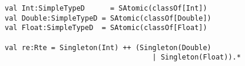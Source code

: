 \begin{lstlisting}[style=scalaioScala]
val Int:SimpleTypeD      = SAtomic(classOf[Int])
val Double:SimpleTypeD = SAtomic(classOf[Double])
val Float:SimpleTypeD  = SAtomic(classOf[Float])

val re:Rte = Singleton(Int) ++ (Singleton(Double) 
                                   | Singleton(Float)).*
\end{lstlisting}
